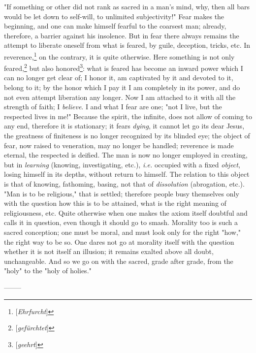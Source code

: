 \documentclass[a4paper]{book}
\begin{document}
 "{}If something or other did not rank as sacred in a man's mind, why, then 
all bars would be let down to self-will, to unlimited subjectivity!"{} Fear 
makes the beginning, and one can make himself fearful to the coarsest man; 
already, therefore, a barrier against his insolence. But in fear there always 
remains the attempt to liberate oneself from what is feared, by guile, 
deception, tricks, etc. In reverence,\footnote{[\textit{Ehrfurcht}]} on the 
contrary, it is quite otherwise. Here something is not only 
feared,\footnote{[\textit{gef\"urchtet}]} but also 
honored\footnote{[\textit{geehrt}]}: what is feared has become an inward power 
which I can no longer get clear of; I honor it, am captivated by it and 
devoted to it, belong to it; by the honor which I pay it I am completely in 
its power, and do not even attempt liberation any longer. Now I am attached to 
it with all the strength of faith; I \textit{believe}. I and what I fear are 
one; "{}not I live, but the respected lives in me!"{} Because the spirit, the 
infinite, does not allow of coming to any end, therefore it is stationary; it 
fears \textit{dying}, it cannot let go its dear Jesus, the greatness of 
finiteness is no longer recognized by its blinded eye; the object of fear, now 
raised to veneration, may no longer be handled; reverence is made eternal, the 
respected is deified. The man is now no longer employed in creating, but in 
\textit{learning} (knowing, investigating, etc.), \textit{i.e.} occupied with 
a fixed \textit{object}, losing himself in its depths, without return to 
himself. The relation to this object is that of knowing, fathoming, basing, 
not that of \textit{dissolution} (abrogation, etc.). "{}Man is to be 
religious,"{} that is settled; therefore people busy themselves only with the 
question how this is to be attained, what is the right meaning of 
religiousness, etc. Quite otherwise when one makes the axiom itself doubtful 
and calls it in question, even though it should go to smash. Morality too is 
such a sacred conception; one must be moral, and must look only for the right 
"{}how,"{} the right way to be so. One dares not go at morality itself with 
the question whether it is not itself an illusion; it remains exalted above 
all doubt, unchangeable. And so we go on with the sacred, grade after grade, 
from the "{}holy"{} to the "{}holy of holies."{}

\begin{center}
--------\end{center}
\end{document}
